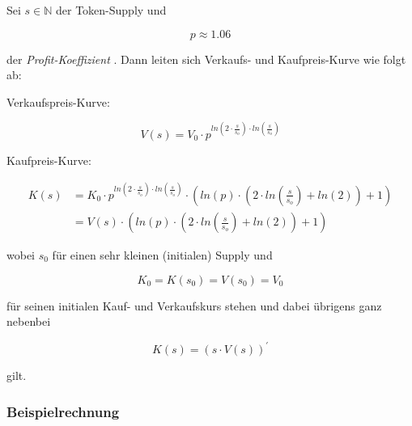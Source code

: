 \begin{Solution}

Sei $s \in \mathbb{N}$ der Token-Supply und 

\begin{equation*}
p \approx 1.06
\end{equation*}

der \textit{Profit-Koeffizient} .
Dann leiten sich Verkaufs- und Kaufpreis-Kurve wie folgt ab:

\vspace{0.2cm}

Verkaufspreis-Kurve:

\begin{equation*}
V(s) = V_{0} \cdot p^{ln\left(2 \cdot \frac{s}{s_{o}}\right) \cdot ln\left(\frac{s}{s_{o}}\right)}
\end{equation*}

\vspace{0.2cm}

Kaufpreis-Kurve:

\begin{align*}
K(s) &= K_{0} \cdot p^{ln\left(2 \cdot \frac{s}{s_{o}}\right) \cdot ln\left(\frac{s}{s_{o}}\right)} \cdot \left( ln(p) \cdot \left( 2 \cdot ln\left( \frac{s}{s_{o}} \right) + ln(2) \right) + 1 \right) \\
 &= V(s) \cdot \left( ln(p) \cdot \left( 2 \cdot ln\left( \frac{s}{s_{o}} \right) + ln(2) \right) + 1 \right)
\end{align*}

\vspace{0.4cm}

wobei $s_{0}$ für einen sehr kleinen (initialen) Supply und 

\begin{equation*}
K_{0} = K(s_{0}) = V(s_{0}) = V_{0}
\end{equation*}

für seinen initialen Kauf- und Verkaufskurs stehen und dabei übrigens ganz nebenbei 

\begin{equation*}
K(s) = \left( s \cdot V(s) \right)^{\prime}
\end{equation*}

gilt.

\end{Solution}

\vspace{0.5cm}


\subsubsection{Beispielrechnung}
\vspace{0.2cm}

